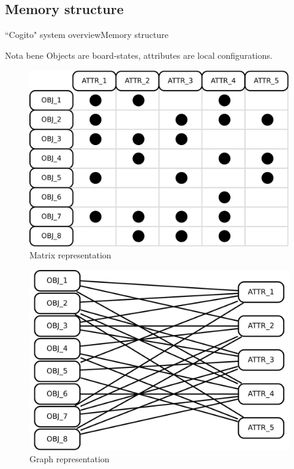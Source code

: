 \subsection{Memory structure}
\begin{frame}{``Cogito" system overview}{Memory structure}

\begin{block}{Nota bene}
Objects are board-states, attributes are local configurations.
\end{block}

\begin{figure}[ht]
  \begin{minipage}[t]{0.45\linewidth}
    \vspace{0pt}
    \centering
    \includegraphics[width=\textwidth]{img/cogito/context_matrix}
    \\ Matrix representation
  \end{minipage}
  \hfill
  \begin{minipage}[t]{0.45\textwidth}
    \vspace{0pt}
    \centering
    \includegraphics[width=\textwidth]{img/cogito/context_graph}
    \\ Graph representation
  \end{minipage}
\end{figure}

\end{frame}

